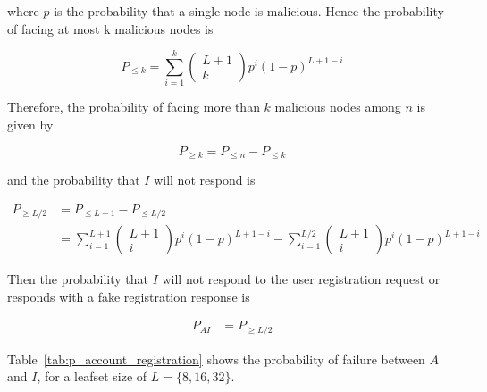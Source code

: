     where $p$ is the probability that a single node is malicious. Hence the
probability of facing at most k malicious nodes is 

    \begin{equation}
      P_{\leq k} = \sum_{i=1}^{k} \begin{pmatrix} L+1 \\ k\end{pmatrix} p^i (1-p)^{L+1-i}
    \end{equation}

    Therefore, the probability of facing more than $k$ malicious nodes among
$n$ is given by

    \begin{equation} \label{eq:p_malicious_ge_k}
      P_{\ge k} = P_{\leq n} - P_{\leq k}
    \end{equation}

    and the probability that $I$ will not respond is


    \begin{align} \label{eq:p_malicious_ge_L_2}
      P_{\ge L/2} &= P_{\leq L+1} - P_{\leq L/2} \\
      &= \sum_{i=1}^{L+1} \begin{pmatrix} L+1 \\ i\end{pmatrix} p^i (1-p)^{L+1-i}
      - \sum_{i=1}^{L/2} \begin{pmatrix} L+1 \\ i\end{pmatrix} p^i (1-p)^{L+1-i}
    \end{align}


    Then the probability that $I$ will not respond to the user registration
request or responds with a fake registration response is

    \begin{align}
      P_{AI} &= P_{\ge L/2} 
    \end{align}


    Table~\eqref{tab:p_account_registration} shows the probability of failure
between $A$ and $I$, for a leafset size of $L = \{8,16,32\}$.

